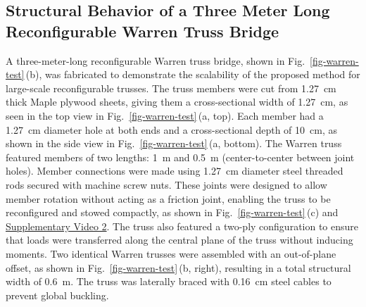 \subsection{Structural Behavior of a Three Meter Long Reconfigurable Warren Truss Bridge}\label{02-subsec-warren-truss}
A three-meter-long reconfigurable Warren truss bridge, shown in Fig.~\ref{fig-warren-test}\,(b), was fabricated to demonstrate the scalability of the proposed method for large-scale reconfigurable trusses. The truss members were cut from 1.27~cm thick Maple plywood sheets, giving them a cross-sectional width of 1.27~cm, as seen in the top view in Fig.~\ref{fig-warren-test}\,(a, top). Each member had a 1.27~cm diameter hole at both ends and a cross-sectional depth of 10~cm, as shown in the side view in Fig.~\ref{fig-warren-test}\,(a, bottom). The Warren truss featured members of two lengths: 1~m and 0.5~m (center-to-center between joint holes). Member connections were made using 1.27~cm diameter steel threaded rods secured with machine screw nuts. These joints were designed to allow member rotation without acting as a friction joint, enabling the truss to be reconfigured and stowed compactly, as shown in Fig.~\ref{fig-warren-test}\,(c) and \hyperref[fig-supplementary-video-2]{Supplementary Video 2}. The truss also featured a two-ply configuration to ensure that loads were transferred along the central plane of the truss without inducing moments. Two identical Warren trusses were assembled with an out-of-plane offset, as shown in Fig.~\ref{fig-warren-test}\,(b, right), resulting in a total structural width of 0.6~m. The truss was laterally braced with 0.16~cm steel cables to prevent global buckling.

